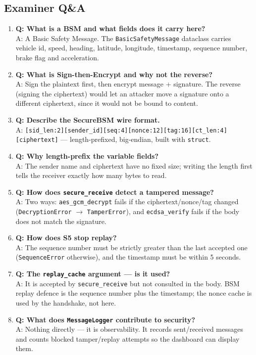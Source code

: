 \documentclass[11pt,a4paper]{report}
\begin{document}
\subsection{Examiner Q\&A}
\begin{enumerate}
  \item \textbf{Q: What is a BSM and what fields does it carry here?}\\
        A: A Basic Safety Message. The \texttt{BasicSafetyMessage} dataclass
        carries vehicle id, speed, heading, latitude, longitude, timestamp,
        sequence number, brake flag and acceleration.
  \item \textbf{Q: What is Sign-then-Encrypt and why not the reverse?}\\
        A: Sign the plaintext first, then encrypt message + signature. The
        reverse (signing the ciphertext) would let an attacker move a signature
        onto a different ciphertext, since it would not be bound to content.
  \item \textbf{Q: Describe the SecureBSM wire format.}\\
        A: \texttt{[sid\_len:2][sender\_id][seq:4][nonce:12][tag:16][ct\_len:4]
        [ciphertext]} --- length-prefixed, big-endian, built with \texttt{struct}.
  \item \textbf{Q: Why length-prefix the variable fields?}\\
        A: The sender name and ciphertext have no fixed size; writing the length
        first tells the receiver exactly how many bytes to read.
  \item \textbf{Q: How does \texttt{secure\_receive} detect a tampered message?}\\
        A: Two ways: \texttt{aes\_gcm\_decrypt} fails if the ciphertext/nonce/tag
        changed (\texttt{DecryptionError} $\to$ \texttt{TamperError}), and
        \texttt{ecdsa\_verify} fails if the body does not match the signature.
  \item \textbf{Q: How does S5 stop replay?}\\
        A: The sequence number must be strictly greater than the last accepted
        one (\texttt{SequenceError} otherwise), and the timestamp must be within
        5 seconds.
  \item \textbf{Q: The \texttt{replay\_cache} argument --- is it used?}\\
        A: It is accepted by \texttt{secure\_receive} but not consulted in the
        body. BSM replay defence is the sequence number plus the timestamp; the
        nonce cache is used by the handshake, not here.
  \item \textbf{Q: What does \texttt{MessageLogger} contribute to security?}\\
        A: Nothing directly --- it is observability. It records sent/received
        messages and counts blocked tamper/replay attempts so the dashboard can
        display them.
\end{enumerate}
\end{document}

